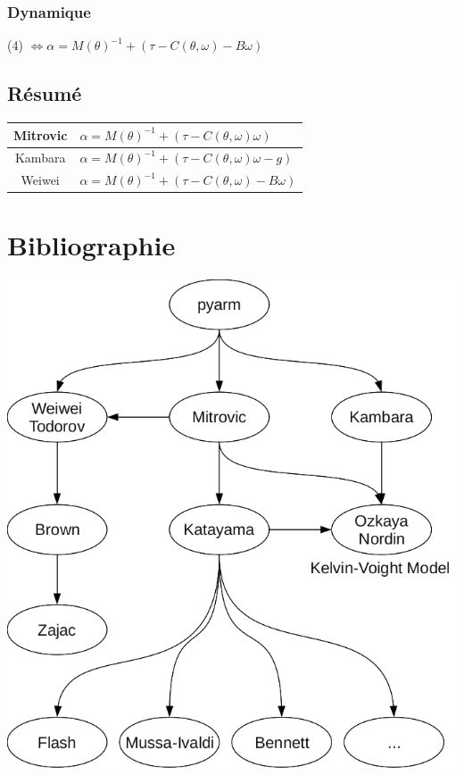 \documentclass[pdftex,a4paper,11pt]{article}
\begin{document}
\subsubsection{Dynamique}
(4) $\Leftrightarrow \alpha = M(\theta)^{-1} + (\tau - C(\theta, \omega) - B\omega) $

\subsection{Résumé}
\begin{tabular}{|c|l|}
    \hline
    Mitrovic  & $\alpha = M(\theta)^{-1} + (\tau - C(\theta, \omega) \omega)$ \\
    \hline
    Kambara  & $\alpha = M(\theta)^{-1} + (\tau - C(\theta, \omega) \omega - g)$ \\
    \hline
    Weiwei  & $\alpha = M(\theta)^{-1} + (\tau - C(\theta, \omega) - B\omega)$ \\
    \hline
\end{tabular}


\section{Bibliographie}

\begin{center}
        \includegraphics[width=.80\linewidth]{fig/bib}
\end{center}
\end{document}
